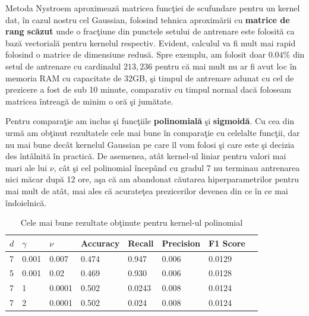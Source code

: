 Metoda Nystroem aproximează matricea funcţiei de scufundare pentru un kernel dat,
în cazul nostru cel Gaussian, folosind tehnica aproximării cu \textbf{matrice de 
rang scăzut} unde o fracţiune din punctele setului de antrenare este folosită 
ca bază vectorială pentru kernelul respectiv. Evident, calculul va fi mult mai 
rapid folosind o matrice de dimensiune redusă. Spre exemplu, am folosit doar 
\textbf{$0.04\%$} din setul de antrenare cu cardinalul $213,236$ pentru că mai mult nu 
ar fi avut loc în memoria
RAM cu capacitate de 32GB, şi timpul de antrenare adunat cu cel de prezicere a 
fost de sub 10 minute,
comparativ cu timpul normal dacă foloseam matricea întreagă de minim o oră şi 
jumătate.

Pentru comparaţie am inclus şi funcţiile \textbf{polinomială} şi 
\textbf{sigmoidă}. Cu cea din urmă am obţinut rezultatele cele mai bune în comparaţie
cu celelalte funcţii, dar  
nu mai bune decât kernelul Gaussian pe care îl vom folosi şi care 
este şi decizia des întâlnită în practică. De asemenea, atât kernel-ul liniar pentru valori mai mari
ale lui $\nu$, 
cât şi cel polinomial începând cu gradul 7 nu terminau antrenarea nici măcar 
după 12 ore, aşa că am abandonat căutarea hiperparametrilor pentru mai mult 
de atât, mai ales că acurateţea prezicerilor devenea din ce în ce mai îndoielnică.

\begin{table}[H]
    \centering
    \begin{tabularx}{\textwidth}{
        |X
        |X
        |X
        |X
        |X
        |X
        |X
        |X|
    }
    \hline
    $d$ & $\gamma$ & $\nu$ & {Accuracy} & {Recall} & {Precision} & {F1 Score} \\
    \hline
    \rowcolor{gray!20} 7 & 0.001 & 0.007 & 0.474	& 0.947 & 0.006	& 0.0129    \\
    5 & 0.001 & 0.02 & 0.469	& 0.930	& 0.006	& 0.0128 \\
    \rowcolor{gray!20} 7 & 1 & 0.0001	& 0.502	& 0.0243	& 0.008	& 0.0124   \\
    7 & 2 & 0.0001 & 0.502	& 0.024	& 0.008	& 0.0124 \\
    \hline
  \end{tabularx}
  \caption{Cele mai bune rezultate obţinute pentru kernel-ul polinomial}
\end{table}

